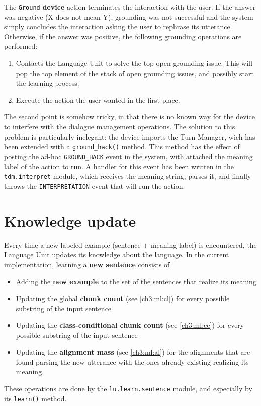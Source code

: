 The \texttt{Ground} \textbf{device} action terminates the interaction with the user. If the answer was negative (X does not mean Y), grounding was not successful and the system simply concludes the interaction asking the user to rephrase its utterance. Otherwise, if the answer was positive, the following grounding operations are performed:
\begin{enumerate}
	\item Contacts the Language Unit to solve the top open grounding issue. This will pop the top element of the stack of open grounding issues, and possibly start the learning process.
	\item Execute the action the user wanted in the first place.
\end{enumerate}

The second point is somehow tricky, in that there is no known way for the device to interfere with the dialogue management operations. The solution to this problem is particularly inelegant: the device imports the Turn Manager, wich has been extended with a \texttt{ground\_hack()} method. This method has the effect of posting the ad-hoc \texttt{GROUND\_HACK} event in the system, with attached the meaning label of the action to run. A handler for this event has been written in the \texttt{tdm.interpret} module, which receives the meaning string, parses it, and finally throws the \texttt{INTERPRETATION} event that will run the action.


\section{Knowledge update} \label{ch:interaction:learn}

Every time a new labeled example (sentence + meaning label) is encountered, the Language Unit updates its knowledge about the language. In the current implementation, learning a \textbf{new sentence} consists of
\begin{itemize}
	\item Adding the \textbf{new example} to the set of the sentences that realize its meaning
	\item Updating the global \textbf{chunk count} (see \ref{ch3:ml:cl}) for every possible substring of the input sentence
	\item Updating the \textbf{class-conditional chunk count} (see \ref{ch3:ml:cc}) for every possible substring of the input sentence
	\item Updating the \textbf{alignment mass} (see \ref{ch3:ml:al}) for the alignments that are found parsing the new utterance with the ones already existing realizing its meaning.
\end{itemize}
These operations are done by the \texttt{lu.learn.sentence} module, and especially by its \texttt{learn()} method.

